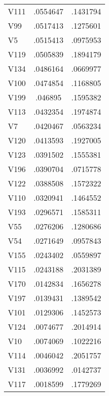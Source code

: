 \documentclass{article}
\begin{document}
\begin{table}[tbp]
\begin{tabularx}{\linewidth}{@{}lCC@{}}
V111&.0554647&.1431794 \tabularnewline
V99&.0517413&.1275601 \tabularnewline
V5&.0515413&.0975953 \tabularnewline
V119&.0505839&.1894179 \tabularnewline
V134&.0486164&.0669977 \tabularnewline
V100&.0474854&.1168805 \tabularnewline
V199&.046895&.1595382 \tabularnewline
V113&.0432354&.1974874 \tabularnewline
V7&.0420467&.0563234 \tabularnewline
V120&.0413593&.1927005 \tabularnewline
V123&.0391502&.1555381 \tabularnewline
V196&.0390704&.0715778 \tabularnewline
V122&.0388508&.1572322 \tabularnewline
V110&.0320941&.1464552 \tabularnewline
V193&.0296571&.1585311 \tabularnewline
V55&.0276206&.1280686 \tabularnewline
V54&.0271649&.0957843 \tabularnewline
V155&.0243402&.0559897 \tabularnewline
V115&.0243188&.2031389 \tabularnewline
V170&.0142834&.1656278 \tabularnewline
V197&.0139431&.1389542 \tabularnewline
V101&.0129306&.1452573 \tabularnewline
V124&.0074677&.2014914 \tabularnewline
V10&.0074069&.1022216 \tabularnewline
V114&.0046042&.2051757 \tabularnewline
V131&.0036992&.0142737 \tabularnewline
V117&.0018599&.1779269 \tabularnewline
\bottomrule 

\end{tabularx}
\end{table}
\end{document}

